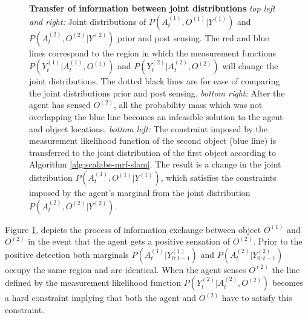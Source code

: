 \begin{figure}
  \centering
  \caption{\textbf{Transfer of information between joint distributions} \textit{top left and right:} Joint distributions of 
   $P(A^{(1)}_t,O^{(1)}|Y^{(1)})$ and $P(A^{(2)}_t,O^{(2)}|Y^{(2)})$ prior and post sensing. The red and blue lines correspond 
  to the region in which the measurement functions $P(Y^{(1)}_{t}|A^{(1)}_t,O^{(1)})$ and $P(Y^{(2)}_{t}|A^{(2)}_t,O^{(2)})$ will change the joint distributions.
  The dotted black lines are for ease of comparing the joint distributions prior and post sensing.
  \textit{bottom right:}  After the agent has sensed $O^{(2)}$, all the probability mass which was not overlapping the blue line becomes an infeasible
  solution to the agent and object locations. \textit{bottom left:} The constraint imposed by the measurement likelihood function of the second object
  (blue line) is transferred to the joint distribution of the first object according to Algorithm \ref{alg:scalabe-mrf-slam}.
  The result is a change in the joint distribution  $P(A^{(1)}_t,O^{(1)}|Y^{(1)})$, which satisfies the constraints 
  imposed by the agent's marginal from the joint distribution $P(A^{(2)}_t,O^{(2)}|Y^{(2)})$.}
  \label{fig:transfer_information}
\end{figure}

Figure \ref{fig:transfer_information}, depicts the process of information exchange between object $O^{(1)}$ and $O^{(2)}$ in the event that the agent 
gets a positive sensation of $O^{(2)}$. Prior to the positive detection both marginals $P(A^{(1)}_t|Y^{(1)}_{0:t-1})$ and $P(A^{(2)}_t|Y^{(2)}_{0:t-1})$ 
occupy the same region and are identical. When the agent senses $O^{(2)}$ the line defined by the measurement 
likelihood function $P(Y^{(2)}_t|A^{(2)}_t,O^{(2)})$ becomes a hard constraint implying that both the agent and $O^{(2)}$ have to satisfy this constraint.

